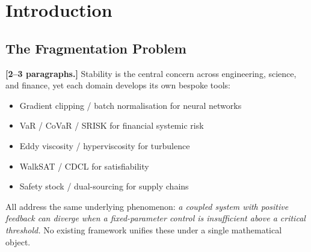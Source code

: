 \documentclass[11pt,a4paper]{article}
\begin{document}
\begin{abstract}
We prove that the double-well binarisation potential $\mu(1-s^2)^2$
connecting continuous relaxation to discrete decisions is the common
mathematical object across all seven domains, and provide empirical
validation in each: MFLS AUC 0.639--0.982 (fraud), 6-quarter GFC
early warning (finance), bounded enstrophy at $\mathrm{Re} \approx
62{,}832$ (Navier--Stokes), 0/8 BSDT variants blow up where SGD/RMSProp diverge at epoch~1, with
training loss $53{,}600\times$ lower than constant clipping
(neural training), 94--100\% solve rate at $\alpha=4.0$ random 3-SAT
(combinatorial), zero cascade depth across 5 historical supply chain
disruptions where constant buffers fail (COVID semiconductor, Suez,
Fukushima, Thai floods, Texas ERCOT), and MFLS AUC 0.973 for quantum
phase transition detection in the 1D transverse-field Ising model
($N=12$, zero domain knowledge, ranking \#5 of 22 standard methods).

\end{abstract}


\section{Introduction}\label{sec:intro}

\subsection{The Fragmentation Problem}

\textbf{[2--3 paragraphs.]}
Stability is the central concern across engineering, science, and finance, yet
each domain develops its own bespoke tools:
\begin{itemize}[nosep]
  \item Gradient clipping / batch normalisation for neural networks
  \item VaR / CoVaR / SRISK for financial systemic risk
  \item Eddy viscosity / hyperviscosity for turbulence
  \item WalkSAT / CDCL for satisfiability
  \item Safety stock / dual-sourcing for supply chains
\end{itemize}
All address the same underlying phenomenon:
\emph{a coupled system with positive feedback can diverge when a
fixed-parameter control is insufficient above a critical threshold.}
No existing framework unifies these under a single mathematical object.
\end{document}
